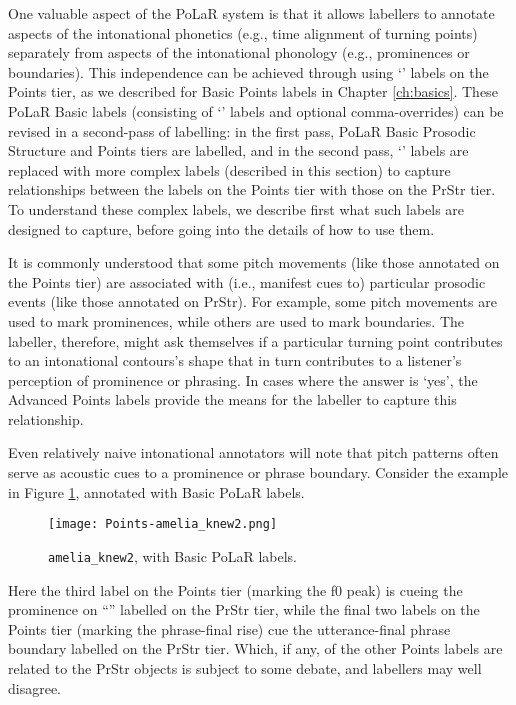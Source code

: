 One valuable aspect of the PoLaR system is that it allows labellers to annotate aspects of the intonational phonetics (e.g., time alignment of turning points) separately from aspects of the intonational phonology (e.g., prominences or boundaries). This independence can be achieved through using ‘’ labels on the Points tier, as we described for Basic Points labels in Chapter \ref{ch:basics}. These PoLaR Basic labels (consisting of ‘’ labels and optional comma-overrides) can be revised in a second-pass of labelling: in the first pass, PoLaR Basic Prosodic Structure and Points tiers are labelled, and in the second pass, ‘’ labels are replaced with more complex labels (described in this section) to capture relationships between the  labels on the Points tier with those on the PrStr tier. To understand these complex labels, we describe first what such labels are designed to capture, before going into the details of how to use them.

It is commonly understood that some pitch movements (like those annotated on the Points tier) are associated with (i.e., manifest cues to) particular prosodic events (like those annotated on PrStr). For example, some pitch movements are used to mark prominences, while others are used to mark boundaries. The labeller, therefore, might ask themselves if a particular turning point contributes to an intonational contours’s shape that in turn contributes to a listener’s perception of prominence or phrasing. In cases where the answer is ‘yes’, the Advanced Points labels provide the means for the labeller to capture this relationship.

Even relatively naive intonational annotators will note that pitch patterns often serve as acoustic cues to a prominence or phrase boundary. Consider the example in Figure \ref{fig:amelia_knew2 in Adv}, annotated with Basic PoLaR labels.

\begin{figure}[H]
\centering
%
\texttt{[image: Points-amelia\_knew2.png]}
%
\caption{\texttt{amelia\_knew2}, with Basic PoLaR labels.%
\label{fig:amelia_knew2 in Adv}%
}
\end{figure}

Here the third label on the Points tier (marking the f0 peak) is cueing the prominence on “” labelled on the PrStr tier, while the final two labels on the Points tier (marking the phrase-final rise) cue the utterance-final phrase boundary labelled on the PrStr tier. Which, if any, of the other Points labels are related to the PrStr objects is subject to some debate, and labellers may well disagree.

